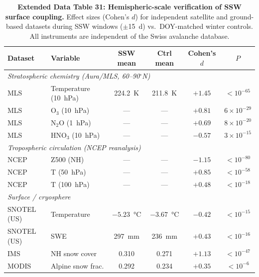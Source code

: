 \documentclass[11pt,letterpaper]{article}
\begin{document}
\begin{table}[!ht]
\centering
\caption{\textbf{Extended Data Table 31: Hemispheric-scale verification of SSW surface coupling.}
Effect sizes (Cohen's $d$) for independent satellite and ground-based datasets during SSW windows ($\pm$15~d) vs.\ DOY-matched winter controls. All instruments are independent of the Swiss avalanche database.}
\label{tab:hemispheric}
\small
\begin{tabular}{llcccc}
\toprule
Dataset & Variable & SSW mean & Ctrl mean & Cohen's $d$ & $P$ \\
\midrule
\multicolumn{6}{l}{\textit{Stratospheric chemistry (Aura/MLS, 60--90$^\circ$N)}} \\
MLS & Temperature (10~hPa) & 224.2~K & 211.8~K & $+1.45$ & $< 10^{-65}$ \\
MLS & O$_3$ (10~hPa) & --- & --- & $+0.81$ & $6 \times 10^{-29}$ \\
MLS & N$_2$O (1~hPa) & --- & --- & $+0.69$ & $8 \times 10^{-20}$ \\
MLS & HNO$_3$ (10~hPa) & --- & --- & $-0.57$ & $3 \times 10^{-15}$ \\
\midrule
\multicolumn{6}{l}{\textit{Tropospheric circulation (NCEP reanalysis)}} \\
NCEP & Z500 (NH) & --- & --- & $-1.15$ & $< 10^{-80}$ \\
NCEP & T (50~hPa) & --- & --- & $+0.85$ & $< 10^{-58}$ \\
NCEP & T (100~hPa) & --- & --- & $+0.48$ & $< 10^{-18}$ \\
\midrule
\multicolumn{6}{l}{\textit{Surface / cryosphere}} \\
SNOTEL (US) & Temperature & $-5.23$~°C & $-3.67$~°C & $-0.42$ & $< 10^{-15}$ \\
SNOTEL (US) & SWE & 297~mm & 236~mm & $+0.43$ & $< 10^{-16}$ \\
IMS & NH snow cover & 0.310 & 0.271 & $+1.13$ & $< 10^{-47}$ \\
MODIS & Alpine snow frac. & 0.292 & 0.234 & $+0.35$ & $< 10^{-6}$ \\
\bottomrule
\end{tabular}
\end{table}
\end{document}
